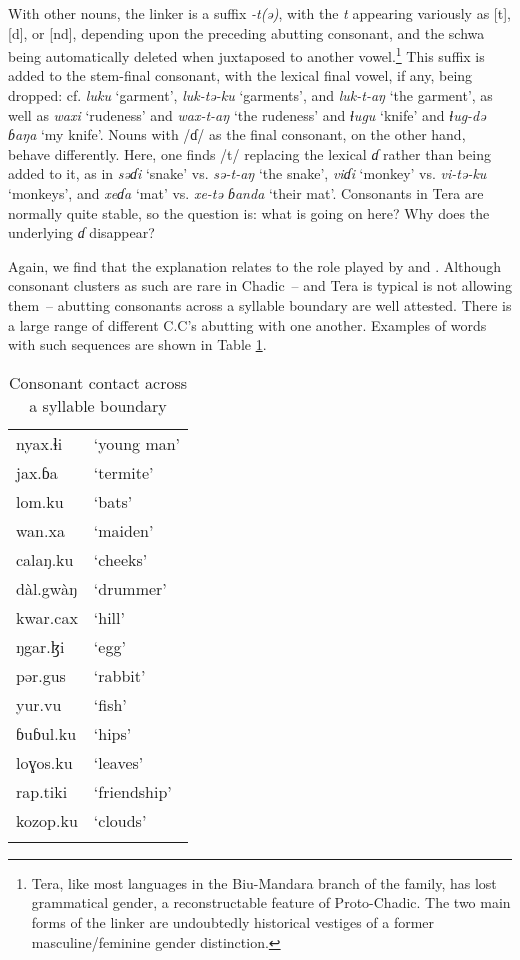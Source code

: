 \documentclass[output=paper,colorlinks,citecolor=brown]{langscibook}
\begin{document}
With other nouns, the linker is a suffix \textit{-t(ǝ)}, with the \textit{t} appearing variously as [t], [d], or [nd], depending upon the preceding abutting consonant, and the schwa being automatically deleted when juxtaposed to another vowel.\footnote{Tera, like most languages in the Biu-Mandara branch of the family, has lost grammatical gender, a reconstructable feature of Proto-Chadic. The two main forms of the linker are undoubtedly historical vestiges of a former masculine/feminine gender distinction.} This suffix is added to the stem-final consonant, with the lexical final vowel, if any, being dropped: cf. \textit{luku} ‘garment', \textit{luk-tǝ-ku} ‘garments’, and \textit{luk-t-aŋ} ‘the garment’, as well as \textit{waxi} ‘rudeness’ and \textit{wax-t-aŋ} `the rudeness’ and \textit{ɬugu} `knife’ and \textit{ɬug-dǝ ɓaŋa} ‘my knife’. Nouns with /ɗ/ as the final consonant, on the other hand, behave differently. Here, one finds /t/ replacing the lexical \textit{ɗ} rather than being added to it, as in \textit{sǝɗi} ‘snake’ vs. \textit{sǝ-t-aŋ} ‘the snake’, \textit{viɗi} `monkey’ vs. \textit{vi-tǝ-ku} `monkeys’, and \textit{xeɗa} `mat’ vs. \textit{xe-tǝ ɓanda} ‘their mat’. Consonants in Tera are normally quite stable, so the question is: what is going on here? Why does the underlying \textit{ɗ} disappear?    

Again, we find that the explanation relates to the role played by  and . Although consonant clusters as such are rare in Chadic~-- and Tera is typical is not allowing them~-- abutting consonants across a syllable boundary are well attested. There is a large range of different C.C’s abutting with one another. Examples of words with such sequences are shown in Table \ref{tab:CCContact}. 

\begin{table}
\caption{Consonant contact across a syllable boundary}
\label{tab:CCContact}
 \begin{tabular}{ll}
  \lsptoprule
nyax.ɬi &  `young man’\\
jax.ɓa &  `termite’\\
lom.ku & `bats’ \\
wan.xa & `maiden’\\
calaŋ.ku & `cheeks’ \\
dàl.gwàŋ &  `drummer’ \\
kwar.cax & `hill’ \\
ŋgar.ɮi & `egg’ \\
pǝr.gus & `rabbit’ \\
yur.vu & `fish’\\
ɓuɓul.ku & `hips’\\
loɣos.ku & `leaves’ \\
rap.tiki  & `friendship’\\
kozop.ku & ‘clouds’\\
  \lspbottomrule
 \end{tabular}
\end{table}
\end{document}
